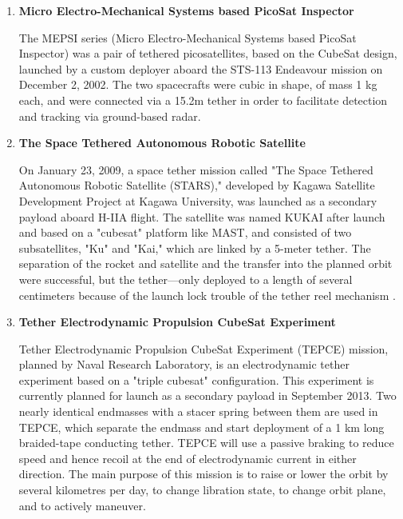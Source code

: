 \begin{enumerate}
\item \textbf{Micro Electro-Mechanical Systems based PicoSat Inspector}

The MEPSI series (Micro Electro-Mechanical Systems based PicoSat Inspector) was a pair of tethered picosatellites, based on the CubeSat design, launched by a custom deployer aboard the STS-113 Endeavour mission on December 2, 2002. The two spacecrafts were cubic in shape, of mass 1 kg each, and were connected via a 15.2m tether in order to facilitate detection and tracking via ground-based radar.


\item \textbf{The Space Tethered Autonomous Robotic Satellite}

On January 23, 2009, a space tether mission called "The Space Tethered Autonomous Robotic Satellite (STARS)," developed by Kagawa Satellite Development Project at Kagawa University, was launched as a secondary payload aboard H-IIA flight. The satellite was named KUKAI after launch and based on a "cubesat" platform like MAST, and consisted of two subsatellites, "Ku" and "Kai," which are linked by a 5-meter tether. The separation of the rocket and satellite and the transfer into the planned orbit were successful, but the tether—only deployed to a length of several centimeters because of the launch lock trouble of the tether reel mechanism .

\item \textbf{Tether Electrodynamic Propulsion CubeSat Experiment}

Tether Electrodynamic Propulsion CubeSat Experiment (TEPCE) mission, planned by Naval Research Laboratory, is an electrodynamic tether experiment based on a "triple cubesat" configuration. This experiment is currently planned for launch as a secondary payload in September 2013. Two nearly identical endmasses with a stacer spring between them are used in TEPCE, which separate the endmass and start deployment of a 1 km long braided-tape conducting tether. TEPCE will use a passive braking to reduce speed and hence recoil at the end of electrodynamic current in either direction.
The main purpose of this mission is to raise or lower the orbit by several kilometres per day, to change libration state, to change orbit plane, and to actively maneuver.
\end{enumerate}
